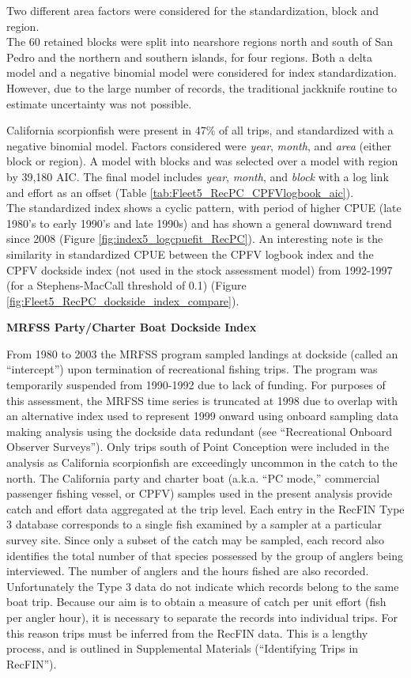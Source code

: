 \documentclass[12pt,]{article}
\begin{document}
Two different area factors were considered for the standardization,
block and region.\\
The 60 retained blocks were split into nearshore regions north and south
of San Pedro and the northern and southern islands, for four regions.
Both a delta model and a negative binomial model were considered for
index standardization. However, due to the large number of records, the
traditional jackknife routine to estimate uncertainty was not possible.

California scorpionfish were present in 47\% of all trips, and
standardized with a negative binomial model. Factors considered were
\emph{year}, \emph{month}, and \emph{area} (either block or region). A
model with blocks and was selected over a model with region by 39,180
AIC. The final model includes \emph{year}, \emph{month}, and
\emph{block} with a log link and effort as an offset (Table
\ref{tab:Fleet5_RecPC_CPFVlogbook_aic}).\\
The standardized index shows a cyclic pattern, with period of higher
CPUE (late 1980's to early 1990's and late 1990s) and has shown a
general downward trend since 2008 (Figure
\ref{fig:index5_logcpuefit_RecPC}). An interesting note is the
similarity in standardized CPUE between the CPFV logbook index and the
CPFV dockside index (not used in the stock assessment model) from
1992-1997 (for a Stephens-MacCall threshold of 0.1) (Figure
\ref{fig:Fleet5_RecPC_dockside_index_compare}).

\textbf{MRFSS Party/Charter Boat Dockside Index}

From 1980 to 2003 the MRFSS program sampled landings at dockside (called
an ``intercept'') upon termination of recreational fishing trips. The
program was temporarily suspended from 1990-1992 due to lack of funding.
For purposes of this assessment, the MRFSS time series is truncated at
1998 due to overlap with an alternative index used to represent 1999
onward using onboard sampling data making analysis using the dockside
data redundant (see ``Recreational Onboard Observer Surveys''). Only
trips south of Point Conception were included in the analysis as
California scorpionfish are exceedingly uncommon in the catch to the
north. The California party and charter boat (a.k.a. ``PC mode,''
commercial passenger fishing vessel, or CPFV) samples used in the
present analysis provide catch and effort data aggregated at the trip
level. Each entry in the RecFIN Type 3 database corresponds to a single
fish examined by a sampler at a particular survey site. Since only a
subset of the catch may be sampled, each record also identifies the
total number of that species possessed by the group of anglers being
interviewed. The number of anglers and the hours fished are also
recorded. Unfortunately the Type 3 data do not indicate which records
belong to the same boat trip. Because our aim is to obtain a measure of
catch per unit effort (fish per angler hour), it is necessary to
separate the records into individual trips. For this reason trips must
be inferred from the RecFIN data. This is a lengthy process, and is
outlined in Supplemental Materials (``Identifying Trips in RecFIN'').
\end{document}
